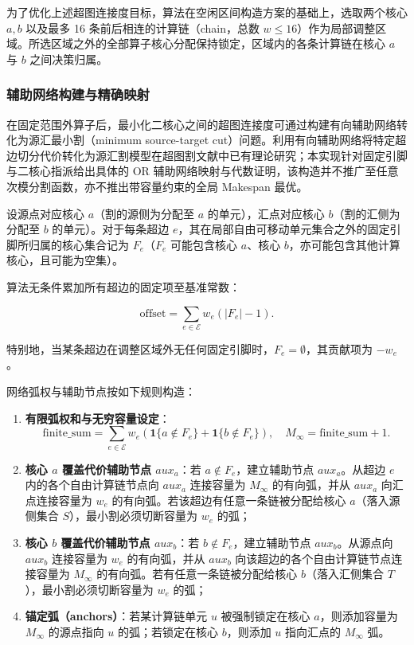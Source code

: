 \documentclass[anonymous,withtoc]{gmcm2026}
\providecommand{\tightlist}{\setlength{\itemsep}{0pt}\setlength{\parskip}{0pt}}
\begin{document}
为了优化上述超图连接度目标，算法在空闲区间构造方案的基础上，选取两个核心 \(a, b\) 以及最多 16 条前后相连的计算链（chain，总数 \(w \le 16\)）作为局部调整区域。所选区域之外的全部算子核心分配保持锁定，区域内的各条计算链在核心 \(a\) 与 \(b\) 之间决策归属。

\subsubsection{辅助网络构建与精确映射}

在固定范围外算子后，最小化二核心之间的超图连接度可通过构建有向辅助网络转化为源汇最小割（minimum source-target cut）问题。利用有向辅助网络将特定超边切分代价转化为源汇割模型在超图割文献中已有理论研究\cite{ref8}；本实现针对固定引脚与二核心指派给出具体的 OR 辅助网络映射与代数证明，该构造并不推广至任意次模分割函数，亦不推出带容量约束的全局 Makespan 最优。

设源点对应核心 \(a\)（割的源侧为分配至 \(a\) 的单元），汇点对应核心 \(b\)（割的汇侧为分配至 \(b\) 的单元）。对于每条超边 \(e\)，其在局部自由可移动单元集合之外的固定引脚所归属的核心集合记为 \(F_e\)（\(F_e\) 可能包含核心 \(a\)、核心 \(b\)，亦可能包含其他计算核心，且可能为空集）。

算法无条件累加所有超边的固定项至基准常数：

\begin{equation}
\text{offset} = \sum_{e \in \mathcal{E}} w_e (|F_e| - 1).
\end{equation}

特别地，当某条超边在调整区域外无任何固定引脚时，\(F_e = \emptyset\)，其贡献项为 \(-w_e\)。

网络弧权与辅助节点按如下规则构造：

\begin{enumerate}
\def\labelenumi{\arabic{enumi}.}
\tightlist
\item
  \textbf{有限弧权和与无穷容量设定}： \begin{equation}
\text{finite\_sum} = \sum_{e \in \mathcal{E}} w_e \left( \mathbf{1}\{a \notin F_e\} + \mathbf{1}\{b \notin F_e\} \right), \quad M_\infty = \text{finite\_sum} + 1.
\end{equation}
\item
  \textbf{核心 \(a\) 覆盖代价辅助节点 \(aux_a\)}：若 \(a \notin F_e\)，建立辅助节点 \(aux_a\)。从超边 \(e\) 内的各个自由计算链节点向 \(aux_a\) 连接容量为 \(M_\infty\) 的有向弧，并从 \(aux_a\) 向汇点连接容量为 \(w_e\) 的有向弧。若该超边有任意一条链被分配给核心 \(a\)（落入源侧集合 \(S\)），最小割必须切断容量为 \(w_e\) 的弧；
\item
  \textbf{核心 \(b\) 覆盖代价辅助节点 \(aux_b\)}：若 \(b \notin F_e\)，建立辅助节点 \(aux_b\)。从源点向 \(aux_b\) 连接容量为 \(w_e\) 的有向弧，并从 \(aux_b\) 向该超边的各个自由计算链节点连接容量为 \(M_\infty\) 的有向弧。若有任意一条链被分配给核心 \(b\)（落入汇侧集合 \(T\)），最小割必须切断容量为 \(w_e\) 的弧；
\item
  \textbf{锚定弧（anchors）}：若某计算链单元 \(u\) 被强制锁定在核心 \(a\)，则添加容量为 \(M_\infty\) 的源点指向 \(u\) 的弧；若锁定在核心 \(b\)，则添加 \(u\) 指向汇点的 \(M_\infty\) 弧。
\end{enumerate}
\end{document}
